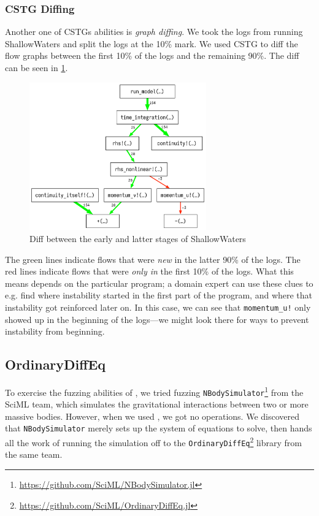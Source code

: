 \documentclass{juliacon}
\begin{document}
\subsubsection{CSTG Diffing}

Another one of CSTGs abilities is \emph{graph diffing}.
We took the \FT{} logs from running ShallowWaters and split the logs at the 10\% mark.
We used CSTG to diff the flow graphs between the first 10\% of the logs and the remaining 90\%.
The diff can be seen in \cref{fig:cstg_diff_demo}.

\begin{figure}[t]
  \centering
  \includegraphics[width=3in]{./fig/cstg_diff_pretty.png}
  \caption{Diff between the early and latter stages of ShallowWaters}
  \label{fig:cstg_diff_demo}
\end{figure}

The green lines indicate flows that were \emph{new} in the latter 90\% of the logs.
The red lines indicate flows that were \emph{only in} the first 10\% of the logs.
What this means depends on the particular program; a domain expert can use these clues to e.g. find where instability started in the first part of the program, and where that instability got reinforced later on.
In this case, we can see that \texttt{momentum\_u!} only showed up in the beginning of the logs---we might look there for ways to prevent instability from beginning.

\subsection{OrdinaryDiffEq}
\label{s:ode}

To exercise the fuzzing abilities of \FT{}, we tried fuzzing \texttt{NBodySimulator}\footnote{\url{https://github.com/SciML/NBodySimulator.jl}} from the SciML team, which simulates the gravitational interactions between two or more massive bodies.
However, when we used \FT{}, we got no \fp{} operations.
We discovered that \texttt{NBodySimulator} merely sets up the system of equations to solve, then hands all the work of running the simulation off to the \texttt{OrdinaryDiffEq}\footnote{\url{https://github.com/SciML/OrdinaryDiffEq.jl}} library from the same team.
\end{document}
